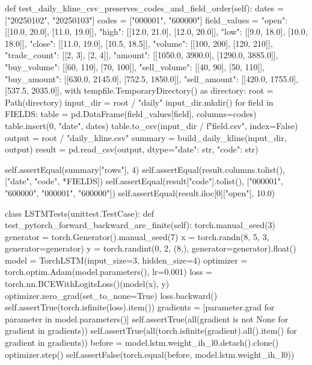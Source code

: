 \documentclass[UTF8,a4paper,fontset=fandol]{ctexart}
\begin{document}
\begin{ProjectCode}
    def test_daily_kline_csv_preserves_codes_and_field_order(self):
        dates = ["20250102", "20250103"]
        codes = ["000001", "600000"]
        field_values = {
            "open": [[10.0, 20.0], [11.0, 19.0]],
            "high": [[12.0, 21.0], [12.0, 20.0]],
            "low": [[9.0, 18.0], [10.0, 18.0]],
            "close": [[11.0, 19.0], [10.5, 18.5]],
            "volume": [[100, 200], [120, 210]],
            "trade_count": [[2, 3], [2, 4]],
            "amount": [[1050.0, 3900.0], [1290.0, 3885.0]],
            "buy_volume": [[60, 110], [70, 100]],
            "sell_volume": [[40, 90], [50, 110]],
            "buy_amount": [[630.0, 2145.0], [752.5, 1850.0]],
            "sell_amount": [[420.0, 1755.0], [537.5, 2035.0]],
        }
        with tempfile.TemporaryDirectory() as directory:
            root = Path(directory)
            input_dir = root / "daily"
            input_dir.mkdir()
            for field in FIELDS:
                table = pd.DataFrame(field_values[field], columns=codes)
                table.insert(0, "date", dates)
                table.to_csv(input_dir / f"{field}.csv", index=False)
            output = root / "daily_kline.csv"
            summary = build_daily_kline(input_dir, output)
            result = pd.read_csv(output, dtype={"date": str, "code": str})

        self.assertEqual(summary["rows"], 4)
        self.assertEqual(result.columns.tolist(), ["date", "code", *FIELDS])
        self.assertEqual(result["code"].tolist(), ["000001", "600000", "000001", "600000"])
        self.assertEqual(result.iloc[0]["open"], 10.0)


class LSTMTests(unittest.TestCase):
    def test_pytorch_forward_backward_are_finite(self):
        torch.manual_seed(3)
        generator = torch.Generator().manual_seed(7)
        x = torch.randn(8, 5, 3, generator=generator)
        y = torch.randint(0, 2, (8,), generator=generator).float()
        model = TorchLSTM(input_size=3, hidden_size=4)
        optimizer = torch.optim.Adam(model.parameters(), lr=0.001)
        loss = torch.nn.BCEWithLogitsLoss()(model(x), y)
        optimizer.zero_grad(set_to_none=True)
        loss.backward()
        self.assertTrue(torch.isfinite(loss).item())
        gradients = [parameter.grad for parameter in model.parameters()]
        self.assertTrue(all(gradient is not None for gradient in gradients))
        self.assertTrue(all(torch.isfinite(gradient).all().item() for gradient in gradients))
        before = model.lstm.weight_ih_l0.detach().clone()
        optimizer.step()
        self.assertFalse(torch.equal(before, model.lstm.weight_ih_l0))


\end{ProjectCode}
\end{document}
